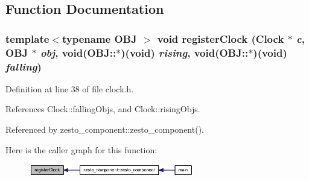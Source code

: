 \subsection{Function Documentation}
\subsubsection[{registerClock}]{\setlength{\rightskip}{0pt plus 5cm}template$<$typename OBJ $>$ void registerClock ({\bf Clock} $\ast$ {\em c}, \/  OBJ $\ast$ {\em obj}, \/  void(OBJ::$\ast$)(void) {\em rising}, \/  void(OBJ::$\ast$)(void) {\em falling})\hspace{0.3cm}{\tt  [inline]}}\label{clock_8h_758b4082294f575c2d756c51ad23bd56}




Definition at line 38 of file clock.h.

References Clock::fallingObjs, and Clock::risingObjs.

Referenced by zesto\_\-component::zesto\_\-component().

Here is the caller graph for this function:\nopagebreak
\begin{figure}[H]
\begin{center}
\leavevmode
\includegraphics[width=203pt]{clock_8h_758b4082294f575c2d756c51ad23bd56_icgraph}
\end{center}
\end{figure}
